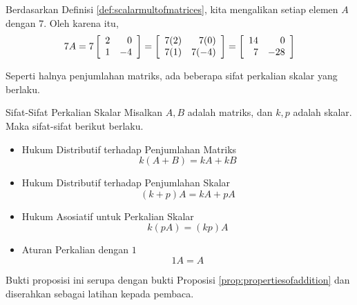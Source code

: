 \begin{solution}
Berdasarkan Definisi \ref{def:scalarmultofmatrices}, kita mengalikan setiap elemen $A$ dengan $7$.
Oleh karena itu,
\begin{equation*}
7A = 
7\left[
\begin{array}{rr}
2 & 0 \\
1 & -4
\end{array}
\right] =
\left[
\begin{array}{rr}
7(2) & 7(0) \\
7(1) & 7(-4)
\end{array}
\right] =
\left[
\begin{array}{rr}
14 & 0 \\
7 & -28
\end{array}
\right]
\end{equation*}
\end{solution}

Seperti halnya penjumlahan matriks, ada beberapa sifat perkalian skalar yang berlaku.

\begin{proposition}{Sifat-Sifat Perkalian Skalar}\label{prop:propertiesscalarmult}
Misalkan $A, B$ adalah matriks, dan $k, p$ adalah skalar. Maka sifat-sifat berikut  berlaku.
\begin{itemize}
\item Hukum Distributif terhadap Penjumlahan Matriks
\begin{equation*}
k \left( A+B\right) =k A+ kB  
\end{equation*}

\item Hukum Distributif terhadap Penjumlahan Skalar
\begin{equation*}
\left( k +p \right) A= k A+p A
\end{equation*}

\item Hukum Asosiatif untuk Perkalian Skalar
\begin{equation*}
k \left( p A\right) = \left( k p \right) A 
\end{equation*}

\item Aturan Perkalian dengan $1$
\begin{equation*}
1A=A  
\end{equation*}
\end{itemize}

\end{proposition}

Bukti proposisi ini serupa dengan bukti Proposisi \ref{prop:propertiesofaddition} dan diserahkan sebagai latihan kepada pembaca.
